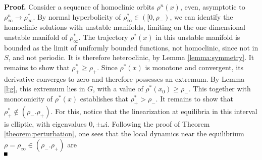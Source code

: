 \documentclass[10pt]{article}
\newenvironment{Proof}%
 {\begin{trivlist} \item[]{\bf Proof. }}%
 {\hspace*{\fill}$\rule{.4\baselineskip}{.4\baselineskip}$\end{trivlist}}
\newcommand{\rmi}{\mathrm{i}}
\renewcommand{\geq}{\geqslant}
\begin{document}
\begin{Proof}  Consider a sequence of homoclinic orbits $\rho^n(x)$, even,  asymptotic to $\rho_\infty^n\to \rho_\infty^*$. By normal hyperbolicity of $\rho_\infty^*\in ([0,\rho_-)$, we can identify the homoclinic solutions with unstable manifolds, limiting on the one-dimensional unstable manifold of $\rho_\infty^*$. The trajectory $\rho^*(x)$ in this unstable manifold is bounded as the limit of uniformly bounded functions, not homoclinic, since not in $S$, and not periodic. It is therefore heteroclinic, by Lemma \ref{lemma:symmetry}. It remains to show that $\rho_+^*\geq \rho_+$. Since $\rho^*(x)$ is monotone and convergent, its derivative converges to zero and therefore possesses an extremum. By Lemma \ref{l:g}, this extremum lies in $G$, with a value of $\rho^*(x_0)\geq \rho_-$. This together with monotonicity of $\rho^*(x)$ establishes that $\rho_+^*> \rho_-$. It remains to show that $\rho_+^*\not\in (\rho_-.\rho_+)$. For this, notice that the linearization at equilibria in this interval is elliptic, with eigenvalues  $0,\pm\omega \rmi$. Following the proof of Theorem \ref{theorem:perturbation}, one sees that the local dynamics near the equilibrium $\rho=\rho_\infty\in (\rho_-.\rho_+)$ are
\[
\]
\end{Proof}
\end{document}
